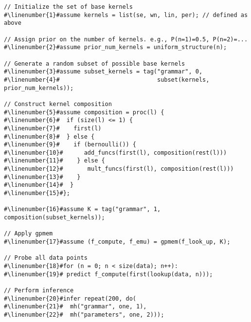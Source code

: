 \begin{mdframed}
\begin{minipage}{\linewidth}
\small
\belowcaptionskip=-10pt
\begin{lstlisting}[mathescape,label=alg:structureVent,basicstyle=\selectfont\ttfamily,numbers=none,caption={Structure
Learning},escapechar=\#]
// Initialize the set of base kernels 
#\linenumber{1}#assume kernels = list(se, wn, lin, per); // defined as above

// Assign prior on the number of kernels. e.g., P(n=1)=0.5, P(n=2)=...
#\linenumber{2}#assume prior_num_kernels = uniform_structure(n);

// Generate a random subset of possible base kernels
#\linenumber{3}#assume subset_kernels = tag("grammar", 0,
#\linenumber{4}#                            subset(kernels, prior_num_kernels));

// Construct kernel composition
#\linenumber{5}#assume composition = proc(l) {
#\linenumber{6}#  if (size(l) <= 1) {
#\linenumber{7}#    first(l)
#\linenumber{8}#  } else {
#\linenumber{9}#    if (bernoulli()) {
#\linenumber{10}#      add_funcs(first(l), composition(rest(l)))
#\linenumber{11}#    } else {
#\linenumber{12}#       mult_funcs(first(l), composition(rest(l)))
#\linenumber{13}#    }
#\linenumber{14}#  }
#\linenumber{15}#};

#\linenumber{16}#assume K = tag("grammar", 1, composition(subset_kernels));

// Apply gpmem 
#\linenumber{17}#assume (f_compute, f_emu) = gpmem(f_look_up, K);

// Probe all data points
#\linenumber{18}#for (n = 0; n < size(data); n++): 
#\linenumber{19}# predict f_compute(first(lookup(data, n)));

// Perform inference
#\linenumber{20}#infer repeat(200, do(
#\linenumber{21}#  mh("grammar", one, 1),
#\linenumber{22}#  mh("parameters", one, 2)));
\end{lstlisting}

\end{minipage}
\end{mdframed}

